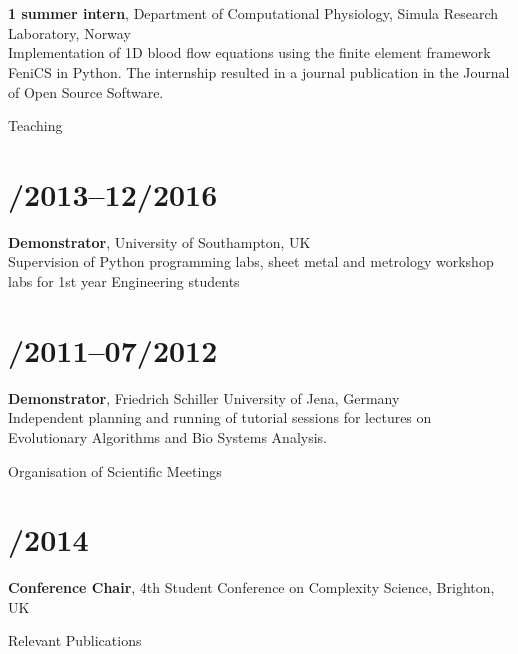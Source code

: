 \documentclass[margin,line,10pt]{res}
\begin{document}
\begin{resume}
\section{}{\bf 1 summer intern}, Department of Computational Physiology, Simula Research Laboratory, Norway\\
Implementation of 1D blood flow equations using the finite element framework FeniCS in Python. The internship resulted in a journal publication in the Journal of Open Source Software.\\

\vspace*{-.2in}

{\sc Teaching}\\
\vspace*{-.35in}
\section{/2013--12/2016}{\bf Demonstrator}, University of Southampton, UK\\
Supervision of Python programming labs, sheet metal and metrology workshop labs for 1st year Engineering students\\
\vspace*{-.35in}
\section{/2011--07/2012}{\bf Demonstrator}, Friedrich Schiller University of Jena, Germany\\
Independent planning and running of tutorial sessions for lectures on Evolutionary Algorithms and Bio Systems Analysis.\\

\vspace*{-.2in}

{\sc Organisation of Scientific Meetings}\\
\vspace*{-.35in}
\section{/2014}{\bf Conference Chair}, 4th Student Conference on Complexity Science, Brighton, UK\\

\vspace*{-.2in}

{\sc Relevant Publications}\\
\vspace*{-.35in}

\end{resume}
\end{document}
